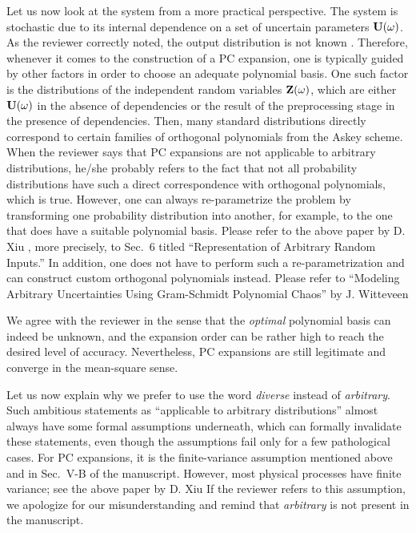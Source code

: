 \begin{authors}
Let us now look at the system from a more practical perspective.
The system is stochastic due to its internal dependence on a set of uncertain parameters $\mathbf{U}(\omega)$.
As the reviewer correctly noted, the output distribution is not known \apriori.
Therefore, whenever it comes to the construction of a PC expansion, one is typically guided by other factors in order to choose an adequate polynomial basis.
One such factor is the distributions of the independent random variables $\mathbf{Z}(\omega)$, which are either $\mathbf{U}(\omega)$ in the absence of dependencies or the result of the preprocessing stage in the presence of dependencies.
Then, many standard distributions directly correspond to certain families of orthogonal polynomials from the Askey scheme.
When the reviewer says that PC expansions are not applicable to arbitrary distributions, he/she probably refers to the fact that not all probability distributions have such a direct correspondence with orthogonal polynomials, which is true.
However, one can always re-parametrize the problem by transforming one probability distribution into another, for example, to the one that does have a suitable polynomial basis.
Please refer to the above paper by D. Xiu \etal, more precisely, to Sec.~6 titled ``Representation of Arbitrary Random Inputs.''
In addition, one does not have to perform such a re-parametrization and can construct custom orthogonal polynomials instead.
Please refer to ``Modeling Arbitrary Uncertainties Using Gram-Schmidt Polynomial Chaos'' by J. Witteveen \etal

We agree with the reviewer in the sense that the \emph{optimal} polynomial basis can indeed be unknown, and the expansion order can be rather high to reach the desired level of accuracy.
Nevertheless, PC expansions are still legitimate and converge in the mean-square sense.

Let us now explain why we prefer to use the word \emph{diverse} instead of \emph{arbitrary}.
Such ambitious statements as ``applicable to arbitrary distributions'' almost always have some formal assumptions underneath, which can formally invalidate these statements, even though the assumptions fail only for a few pathological cases.
For PC expansions, it is the finite-variance assumption mentioned above and in Sec.~V-B of the manuscript.
However, most physical processes have finite variance; see the above paper by D. Xiu \etal{}
If the reviewer refers to this assumption, we apologize for our misunderstanding and remind that \emph{arbitrary} is not present in the manuscript.

\begin{actions}
\end{actions}
\end{authors}

